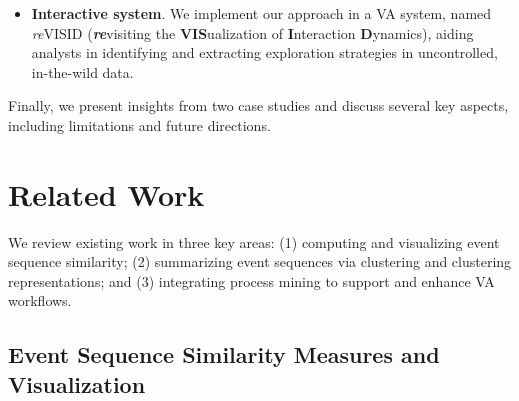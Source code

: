 \documentclass[preprint,journal]{vgtc}            %
\begin{document}
\begin{itemize}[itemsep=-3pt,topsep=1pt]
    \item \textbf{Interactive system}. We implement our approach in a VA system, named \textit{re}VISID (\textit{\textbf{re}}visiting the \textbf{VIS}ualization of \textbf{I}nteraction \textbf{D}ynamics), aiding analysts in identifying and extracting exploration strategies in uncontrolled, in-the-wild data.

    
\end{itemize}
Finally, we present insights from two case studies and discuss several key aspects, including limitations and future directions. %






\section{Related Work}
\label{sec:related-work}

We review existing work in three key areas:  (1) computing and visualizing event sequence similarity; (2) summarizing event sequences via clustering and clustering representations; and (3) integrating process mining to support and enhance VA workflows.



\subsection{Event Sequence Similarity Measures and Visualization}
\end{document}
